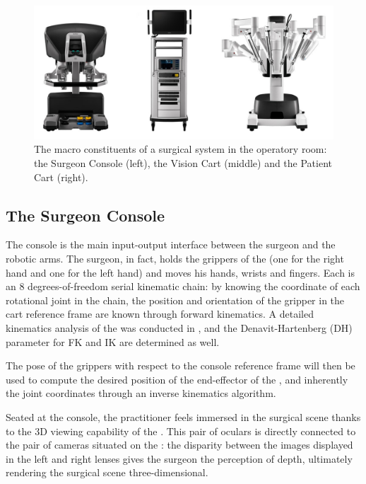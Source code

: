 \documentclass[../main.tex]{subfiles}
\begin{document}
\begin{figure}
    \centering
    \includegraphics[width=\textwidth]{images/davinci_system.jpg}
    \caption{The macro constituents of a \davinci surgical system in the operatory room: the Surgeon Console (left), the Vision Cart (middle) and the Patient Cart (right).}
    \label{fig:davincisystem}
\end{figure}

\subsection{The Surgeon Console}
The console is the main input-output interface between the surgeon and the robotic arms. The surgeon, in fact, holds the grippers of the \mtms (one for the right hand and one for the left hand) and moves his hands, wrists and fingers. Each \mtm is an 8 degrees-of-freedom serial kinematic chain: by knowing the coordinate of each rotational joint in the chain, the position and orientation of the gripper in the cart reference frame are known through forward kinematics. A detailed kinematics analysis of the \davinci was conducted in \cite{Fontanelli2017}, and the Denavit-Hartenberg (DH) parameter for FK and IK are determined as well. 

The pose of the \mtms grippers with respect to the console reference frame will then be used to compute the desired position of the end-effector of the \psms, and inherently the joint coordinates through an inverse kinematics algorithm.

Seated at the console, the practitioner feels immersed in the surgical scene thanks to the 3D viewing capability of the \hrsv. This pair of oculars is directly connected to the pair of cameras situated on the \ecm: the disparity between the images displayed in the left and right lenses gives the surgeon the perception of depth, ultimately rendering the surgical scene three-dimensional. 
\end{document}
